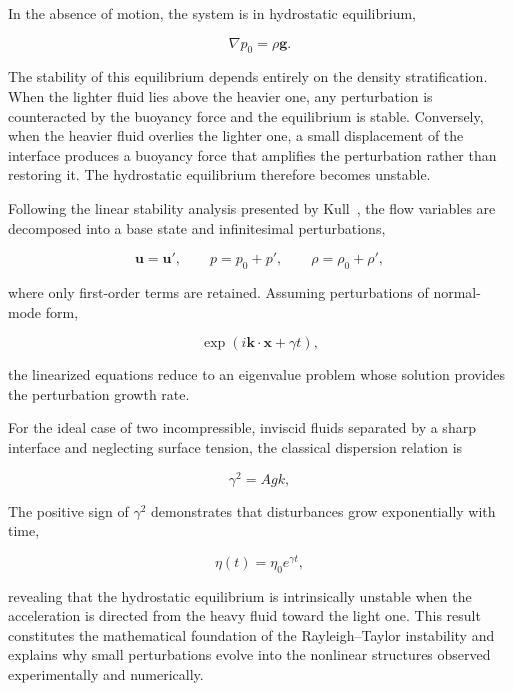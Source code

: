 In the absence of motion, the system is in hydrostatic equilibrium,

\begin{equation}
\nabla p_0=\rho\mathbf{g}.
\end{equation}

The stability of this equilibrium depends entirely on the density stratification. When the lighter fluid lies above the heavier one, any perturbation is counteracted by the buoyancy force and the equilibrium is stable. Conversely, when the heavier fluid overlies the lighter one, a small displacement of the interface produces a buoyancy force that amplifies the perturbation rather than restoring it. The hydrostatic equilibrium therefore becomes unstable.

Following the linear stability analysis presented by Kull~\cite{KULL1991197}, the flow variables are decomposed into a base state and infinitesimal perturbations,

\begin{equation}
\mathbf{u}=\mathbf{u}',
\qquad
p=p_0+p',
\qquad
\rho=\rho_0+\rho',
\end{equation}

where only first-order terms are retained. Assuming perturbations of normal-mode form,

\begin{equation}
\exp\left(i\mathbf{k}\cdot\mathbf{x}+\gamma t\right),
\end{equation}

the linearized equations reduce to an eigenvalue problem whose solution provides the perturbation growth rate.

For the ideal case of two incompressible, inviscid fluids separated by a sharp interface and neglecting surface tension, the classical dispersion relation is

\begin{equation}
\gamma^2=Agk,
\end{equation}

The positive sign of $\gamma^2$ demonstrates that disturbances grow exponentially with time,

\begin{equation}
\eta(t)=\eta_0e^{\gamma t},
\end{equation}

revealing that the hydrostatic equilibrium is intrinsically unstable when the acceleration is directed from the heavy fluid toward the light one. This result constitutes the mathematical foundation of the Rayleigh--Taylor instability and explains why small perturbations evolve into the nonlinear structures observed experimentally and numerically.




